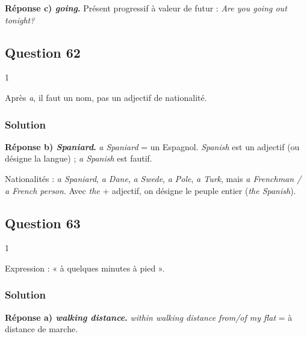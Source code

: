 \documentclass[11pt,a4paper]{article}
\begin{document}
\textbf{Réponse c) \emph{going}.} Présent progressif à valeur de futur : \emph{Are you going out tonight?}

\hypertarget{question-62}{%
\subsection{Question 62}\label{question-62}}

\begin{indication}{1}

Après \emph{a}, il faut un nom, pas un adjectif de nationalité.

\end{indication}

\hypertarget{solution-61}{%
\subsubsection{Solution}\label{solution-61}}

\textbf{Réponse b) \emph{Spaniard}.} \emph{a Spaniard} = un Espagnol. \emph{Spanish} est un adjectif (ou désigne la langue) ; \emph{a Spanish} est fautif.

\begin{piege}

Nationalités : \emph{a Spaniard}, \emph{a Dane}, \emph{a Swede}, \emph{a Pole}, \emph{a Turk}, mais \emph{a Frenchman / a French person}. Avec \emph{the} + adjectif, on désigne le peuple entier (\emph{the Spanish}).

\end{piege}

\hypertarget{question-63}{%
\subsection{Question 63}\label{question-63}}

\begin{indication}{1}

Expression : « à quelques minutes à pied ».

\end{indication}

\hypertarget{solution-62}{%
\subsubsection{Solution}\label{solution-62}}

\textbf{Réponse a) \emph{walking distance}.} \emph{within walking distance from/of my flat} = à distance de marche.
\end{document}
